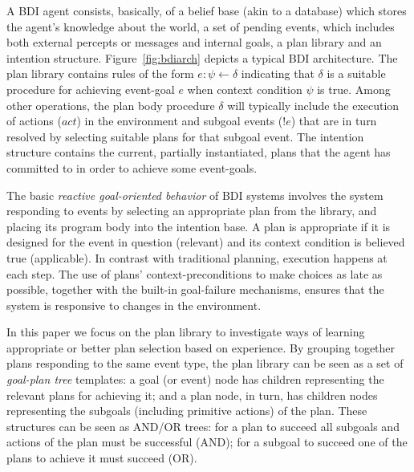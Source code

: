 A BDI agent consists, basically, of a belief base (akin to a
database) which stores the agent's knowledge about the world, a set of
pending events, which includes both external percepts or messages and
internal goals, a plan library and an intention structure.
Figure~\ref{fig:bdiarch} depicts a typical BDI architecture.
The plan library contains rules of the form $e: \psi \leftarrow
\delta$ indicating that $\delta$ is a suitable procedure for achieving
event-goal $e$ when context condition $\psi$ is true.
Among other operations, the plan body procedure $\delta$ will
typically include the 
execution of actions ($act$) in the environment and subgoal events ($!e$) that
are in turn resolved by selecting suitable plans for that subgoal
event.
%
The intention structure contains the current, partially instantiated,
plans that the agent has committed to in order to
achieve some event-goals.

The basic \emph{reactive goal-oriented behavior} of BDI systems involves the
system responding to events by 
selecting an appropriate plan from the library, and placing its
program body into the intention base.
A plan is appropriate if it is designed for the event in question
(relevant) and its context
condition is believed true (applicable).
In contrast with traditional planning, execution happens at each step. The
use of plans' context-preconditions to make choices as
late as possible, together with the built-in goal-failure mechanisms, ensures
that the system is responsive to changes in the environment.

In this paper we focus on the plan library to
investigate ways of learning appropriate or better plan selection
based on experience. 
By grouping together plans responding to the same
event type, the plan library can be seen as a set of \emph{goal-plan tree}
templates: a goal (or event) node has children representing the
relevant plans for achieving it; and a plan node, in turn, has children nodes
representing the subgoals (including primitive actions) of the plan.
These structures can be seen as AND/OR trees: for a plan to succeed all
subgoals and actions of the plan must be successful (AND); for a subgoal to
succeed one of the plans to achieve it must succeed (OR).

